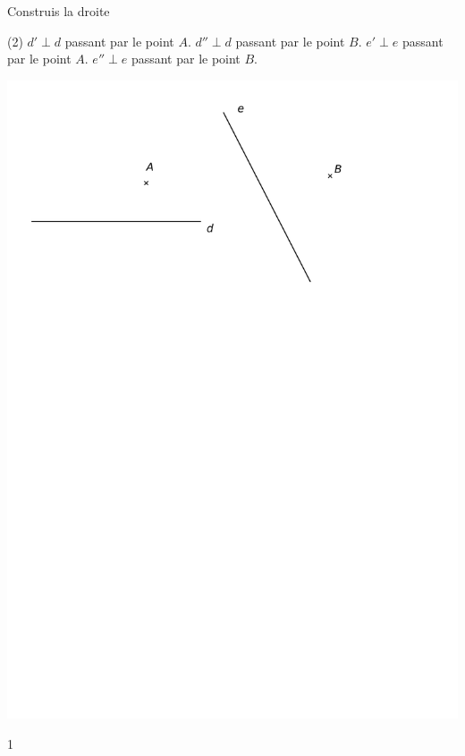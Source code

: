 \documentclass[a4paper,11pt]{report}
\begin{document}
\begin{exop}{Construis la droite
		\begin{tasks}[after-item-skip = 0.4em](2)
	\task $d' \perp d$ passant par le point $A$.
	\task $d''\perp d$ passant par le point $B$.
	\task $e'\perp e$ passant par le point $A$.
	\task $e''\perp e$ passant par le point $B$.
\end{tasks}
	
\begin{center}
\includegraphics[scale=0.8]{media/es-11/13-9}
\end{center}}
{1}
\end{exop}
\end{document}
